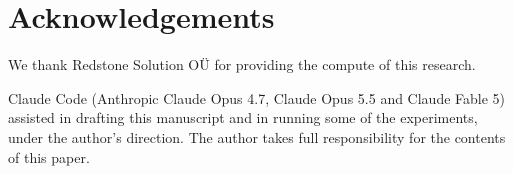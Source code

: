 \section*{Acknowledgements}

We thank Redstone Solution OÜ for providing the compute of this
research.

Claude Code (Anthropic Claude Opus 4.7, Claude Opus 5.5 and Claude
Fable 5) assisted in drafting this manuscript and in running some of the
experiments, under the author's direction. The author takes full
responsibility for the contents of this paper.


